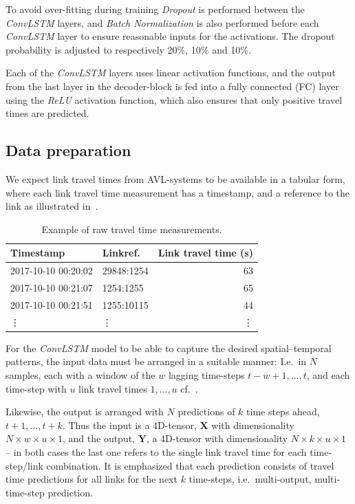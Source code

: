 ﻿\documentclass[preprint,11pt,5p,twocolumn]{elsarticle}
\newcommand{\matr}[1]{\mathbf{#1}}
\begin{document}
To avoid over-fitting during training \emph{Dropout} \cite{Dropout} is performed between the \emph{ConvLSTM} layers, and \emph{Batch Normalization} \cite{BatchNorm} is also performed before each \emph{ConvLSTM} layer to ensure reasonable inputs for the activations. The dropout probability is adjusted to respectively 20\%, 10\% and 10\%.

Each of the \emph{ConvLSTM} layers uses linear activation functions, and the output from the last layer in the decoder-block is fed into a fully connected (FC) layer using the \emph{ReLU} activation function, which also ensures that only positive travel times are predicted.

\subsection{Data preparation}
We expect link travel times from AVL-systems to be available in a tabular form, where each link travel time measurement has a timestamp, and a reference to the link as illustrated in~.
\begin{table}[!ht]
  \centering
  \footnotesize
  \begin{tabular}{llr}
    Timestamp & Linkref. & Link travel time (s) \\ \hline \hline
    2017-10-10 00:20:02 & 29848:1254 & 63 \\ \hline
    2017-10-10 00:21:07 & 1254:1255  & 65 \\ \hline
    2017-10-10 00:21:51 & 1255:10115 & 44 \\ \hline
    \vdots & \vdots & \vdots 
  \end{tabular}
  \caption{Example of raw travel time measurements.}
  \label{tab:data}
\end{table}

For the \emph{ConvLSTM} model to be able to capture the desired spatial--temporal patterns, the input data must be arranged in a suitable manner: I.e.\ in $N$ samples, each with a window of the $w$ lagging time-steps $t-w+1, \ldots, t$, and each time-step with $u$ link travel times $1, \ldots, u$ cf.~.

Likewise, the output is arranged with $N$ predictions of $k$ time steps ahead, $t+1, \ldots, t+k$. Thus the input is a 4D-tensor, $\matr{X}$ with dimensionality $N \times w \times u \times 1$, and the output, $\matr{Y}$, a 4D-tensor with dimensionality $N \times k \times u \times 1$ -- in both cases the last one refers to the single link travel time for each time-step/link combination. It is emphasized that each prediction consists of travel time predictions for all links for the next $k$ time-steps, i.e.\ multi-output, multi-time-step prediction.
\end{document}
